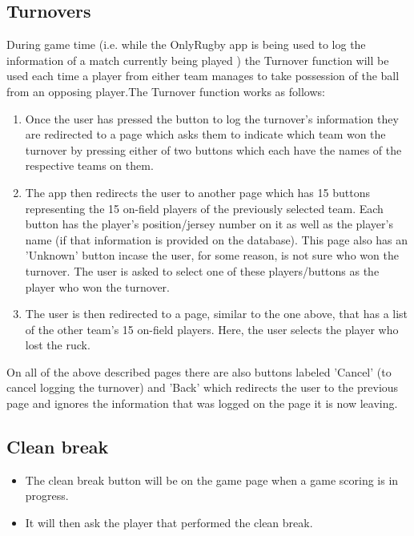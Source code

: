 \documentclass[hidelinks,a4paper,12pt]{article}
\begin{document}
\begin{enumerate}
	\subsection{Turnovers}
		During game time (i.e. while the OnlyRugby app is being used to log the information of a match currently being played ) the Turnover function will be used each time a player from either team manages to take possession of the ball from an opposing player.The Turnover function works as follows:
		\begin{enumerate}
			\item Once the user has pressed the button to log the turnover's information they are redirected to a page which asks them to indicate which team won the turnover by pressing either of two buttons which each
			have the names of the respective teams on them.
			\item The app then redirects the user to another page which has 15 buttons representing the 15 on-field players of the previously selected team. Each button has the player's position/jersey number on it 
			as well as the player's name (if that information is provided on the database). This page also has an 'Unknown' button incase the user, for some reason, is not sure who won the turnover. The user is asked to select one of these players/buttons as the player who won the turnover.
			\item The user is then redirected to a page, similar to the one above, that has a list of the other team's 15 on-field players. Here, the user selects the player who lost the ruck.
		\end{enumerate}
	On all of the above described pages there are also buttons labeled 'Cancel' (to cancel logging the turnover) and 'Back' which redirects the user to the previous page and ignores the information that was logged on the page it is now leaving.

	\subsection{Clean break}
		\begin{itemize}
			\item The clean break button will be on the game page when a game scoring is in progress.
			\item It will then ask the player that performed the clean break.
		\end{itemize}


\end{enumerate}
\end{document}
